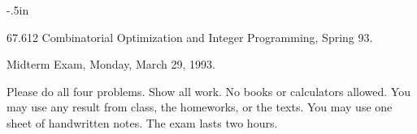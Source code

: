 
\oddsidemargin -.5in
\textwidth 7.5in
\textheight 9in
\topmargin -30pt





\begin{center}
  67.612  Combinatorial Optimization and Integer Programming, Spring 93.
\end{center}

\begin{center}
  Midterm Exam, Monday, March 29, 1993.
\end{center}

Please do all four problems. Show all work. No books or calculators allowed.
You may use any result from class, the homeworks, or the texts.
You may use one sheet of handwritten notes.
The exam lasts two hours.


